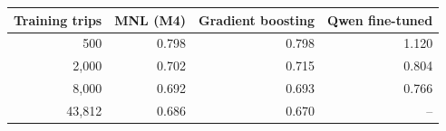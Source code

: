 \begin{tabular}{rrrr}
\toprule
Training trips & MNL (M4) & Gradient boosting & Qwen fine-tuned \\
\midrule
500 & 0.798 & 0.798 & 1.120 \\
2,000 & 0.702 & 0.715 & 0.804 \\
8,000 & 0.692 & 0.693 & 0.766 \\
43,812 & 0.686 & 0.670 & -- \\
\bottomrule
\end{tabular}
